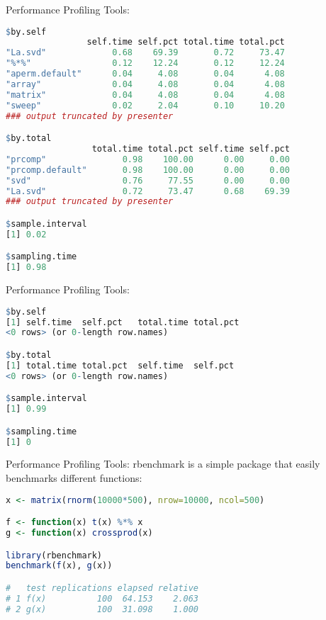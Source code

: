 \begin{frame}[fragile]
  \begin{block}{Performance Profiling Tools: }
  \vspace{-.5cm}
\begin{lstlisting}[language=R]
$by.self
                self.time self.pct total.time total.pct
"La.svd"             0.68    69.39       0.72     73.47
"%*%"                0.12    12.24       0.12     12.24
"aperm.default"      0.04     4.08       0.04      4.08
"array"              0.04     4.08       0.04      4.08
"matrix"             0.04     4.08       0.04      4.08
"sweep"              0.02     2.04       0.10     10.20
### output truncated by presenter

$by.total
                 total.time total.pct self.time self.pct
"prcomp"               0.98    100.00      0.00     0.00
"prcomp.default"       0.98    100.00      0.00     0.00
"svd"                  0.76     77.55      0.00     0.00
"La.svd"               0.72     73.47      0.68    69.39
### output truncated by presenter

$sample.interval
[1] 0.02

$sampling.time
[1] 0.98
\end{lstlisting}
  \end{block}
\end{frame}



\begin{frame}[fragile]
  \begin{block}{Performance Profiling Tools: }
  \vspace{-.5cm}
\begin{lstlisting}[language=R]
$by.self
[1] self.time  self.pct   total.time total.pct 
<0 rows> (or 0-length row.names)

$by.total
[1] total.time total.pct  self.time  self.pct  
<0 rows> (or 0-length row.names)

$sample.interval
[1] 0.99

$sampling.time
[1] 0
\end{lstlisting}
  \end{block}
\end{frame}



\begin{frame}[fragile]
  \begin{block}{Performance Profiling Tools: rbenchmark}
   is a simple package that easily benchmarks different 
functions:
\begin{lstlisting}[language=R]
x <- matrix(rnorm(10000*500), nrow=10000, ncol=500)

f <- function(x) t(x) %*% x
g <- function(x) crossprod(x)

library(rbenchmark)
benchmark(f(x), g(x))

#   test replications elapsed relative
# 1 f(x)          100  64.153    2.063
# 2 g(x)          100  31.098    1.000
\end{lstlisting}
  \end{block}
\end{frame}

